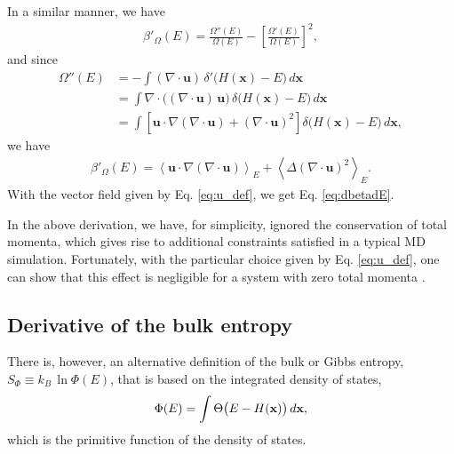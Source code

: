\documentclass[reprint]{revtex4-1}
\begin{document}
In a similar manner, we have
%
\begin{align*}
  \beta'_\Omega(E)
  =
  \frac
  {
    \Omega''(E)
  }
  {
    \Omega(E)
  }
  -
  \left[
    \frac
    {
      \Omega'(E)
    }
    {
      \Omega(E)
    }
  \right]^2
  ,
\end{align*}
%
and since
%
\begin{align*}
  \Omega''(E)
  &= -\int
      \left( \nabla \cdot \mathbf u \right) \,
      \delta'\bigl( H(\mathbf x) - E \bigr) \, d\mathbf x
  \\
  &= \int
     \nabla \cdot \bigl( (\nabla \cdot \mathbf u) \, \mathbf u \bigr) \,
     \delta\bigl( H(\mathbf x) - E \bigr) \, d\mathbf x
  \\
  &= \int
     \left[
     \mathbf u \cdot \nabla (\nabla \cdot \mathbf u)
     +
     (\nabla \cdot \mathbf u)^2
     \right]
     \delta\bigl( H(\mathbf x) - E \bigr) \, d\mathbf x
  ,
\end{align*}
%
we have
%
\begin{align*}
  \beta'_\Omega(E)
  =
  \left\langle
     \mathbf u \cdot \nabla (\nabla \cdot \mathbf u)
  \right\rangle_E
  +
  \left\langle
    \Delta (\nabla \cdot \mathbf u)^2
  \right\rangle_E
  .
\end{align*}
%
With the vector field given by Eq. \eqref{eq:u_def},
we get Eq. \eqref{eq:dbetadE}.

In the above derivation,
we have, for simplicity, ignored the conservation
of total momenta\cite{shirts2006, uline2008},
which gives rise to additional constraints
satisfied in a typical MD simulation\cite{lado1981, wallace1983}.
%
Fortunately, with the particular choice given by Eq. \eqref{eq:u_def},
one can show that this effect is negligible for a system
with zero total momenta\cite{uline2008}
\big[a key observation here is
that for the total momenta $P_\nu = \sum_{i} p_{i, \nu}$,
$\nu = x,y,z$, we have
$\mathbf u \cdot \nabla P_\nu = P_\nu/(2K) = 0$\big].



\subsection{Derivative of the bulk entropy}



There is, however, an alternative definition of the bulk
or Gibbs entropy\cite{cagin1988, haile, dunkel2014},
$S_\Phi \equiv k_B \, \ln \Phi(E)$,
that is based on the integrated density of states,
%
\begin{equation}
  \Phi(E)
  =
  \int
  \Theta\bigl(
    E - H(\mathbf x)
  \bigr)
  \,
  d\mathbf x
  ,
  \notag
\end{equation}
%
which is the primitive function of the density of states.
%
\end{document}
